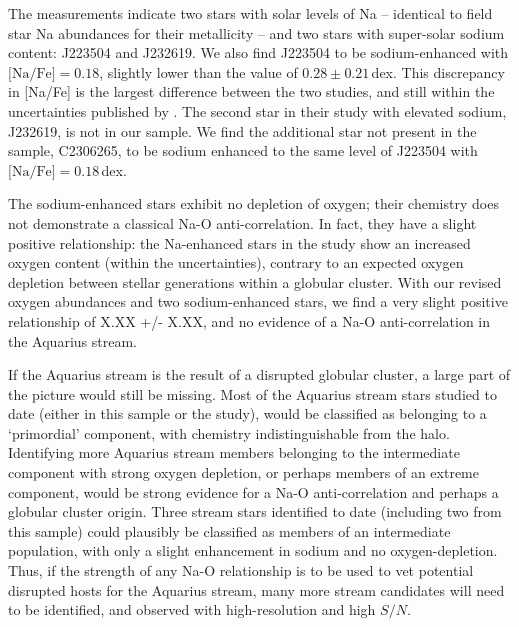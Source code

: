 \documentclass{emulateapj}
\begin{document}




The \citet{wylie-de-boer;et-al_2012} measurements indicate two stars with solar levels of Na \--- identical to field star Na abundances for their metallicity \--- and two stars with super-solar sodium content: J223504 and J232619.
We also find J223504 to be sodium-enhanced with $\mbox{[Na/Fe]} = 0.18$, slightly lower than the \citet{wylie-de-boer;et-al_2012} value of $0.28 \pm 0.21$\,dex. This discrepancy in [Na/Fe] is the largest difference between the two studies, and still within the uncertainties published by \citet{wylie-de-boer;et-al_2012}. The second star in their study with elevated sodium, J232619, is not in our sample. We find the additional star not present in the \citet{wylie-de-boer;et-al_2012} sample, C2306265, to be sodium enhanced to the same level of J223504 with $\mbox{[Na/Fe]} = 0.18$\,dex.

The sodium-enhanced stars exhibit no depletion of oxygen; their chemistry does not demonstrate a classical Na-O anti-correlation. In fact, they have a slight positive relationship: the Na-enhanced stars in the \citet{wylie-de-boer;et-al_2012} study show an increased oxygen content (within the uncertainties), contrary to an expected oxygen depletion between stellar generations within a globular cluster. With our revised oxygen abundances and two sodium-enhanced stars, we find a very slight positive relationship of X.XX +/- X.XX, and no evidence of a Na-O anti-correlation in the Aquarius stream. 


If the Aquarius stream is the result of a disrupted globular cluster, a large part of the picture would still be missing. Most of the Aquarius stream stars studied to date (either in this sample or the \citet{wylie-de-boer;et-al_2012} study), would be classified as belonging to a `primordial' component, with chemistry indistinguishable from the halo. Identifying more Aquarius stream members belonging to the intermediate component with strong oxygen depletion, or perhaps members of an extreme component, would be strong evidence for a Na-O anti-correlation and perhaps a globular cluster origin. Three stream stars identified to date (including two from this sample) could plausibly be classified as members of an intermediate population, with only a slight enhancement in sodium and no oxygen-depletion. Thus, if the strength of any Na-O relationship is to be used to vet potential disrupted hosts for the Aquarius stream, many more stream candidates will need to be identified, and observed with high-resolution and high $S/N$.
\end{document}
